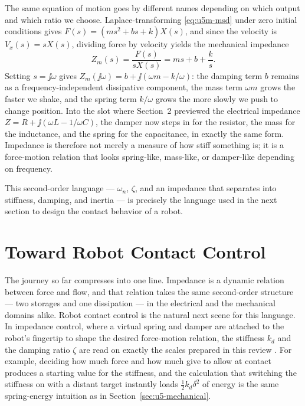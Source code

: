 The same equation of motion goes by different names depending on which
output and which ratio we choose.
Laplace-transforming \eqref{eq:u5m-msd} under zero initial conditions
gives $F(s)=(ms^2+bs+k)X(s)$, and since the velocity is $V_x(s)=sX(s)$,
dividing force by velocity yields the mechanical impedance
\begin{equation}
  Z_m(s)=\frac{F(s)}{sX(s)}=ms+b+\frac{k}{s}.
  \label{eq:u5m-impedance}
\end{equation}
Setting $s=\jj\omega$ gives
$Z_m(\jj\omega)=b+\jj(\omega m-k/\omega)$: the damping term $b$ remains as
a frequency-independent dissipative component, the mass term $\omega m$
grows the faster we shake, and the spring term $k/\omega$ grows the more
slowly we push to change position.
Into the slot where Section~2 previewed the electrical impedance
$Z=R+\jj(\omega L-1/\omega C)$, the damper now steps in for the resistor,
the mass for the inductance, and the spring for the capacitance, in
exactly the same form.
Impedance is therefore not merely a measure of how stiff something is; it
is a force-motion relation that looks spring-like, mass-like, or
damper-like depending on frequency.

This second-order language --- $\omega_n$, $\zeta$, and an impedance that
separates into stiffness, damping, and inertia --- is precisely the
language used in the next section to design the contact behavior of a
robot.

\section{Toward Robot Contact Control}
\label{sec:u5-outlook}

The journey so far compresses into one line.
Impedance is a dynamic relation between force and flow, and that relation
takes the same second-order structure --- two storages and one dissipation
--- in the electrical and the mechanical domains alike.
Robot contact control is the natural next scene for this language.
In impedance control, where a virtual spring and damper are attached to
the robot's fingertip to shape the desired force-motion relation, the
stiffness $k_d$ and the damping ratio $\zeta$ are read on exactly the
scales prepared in this review \cite{hogan1985impedancepart1}.
For example, deciding how much force and how much give to allow at contact
produces a starting value for the stiffness, and the calculation that
switching the stiffness on with a distant target instantly loads
$\frac{1}{2}k_d\delta^2$ of energy is the same spring-energy intuition as
in Section~\ref{sec:u5-mechanical}.

